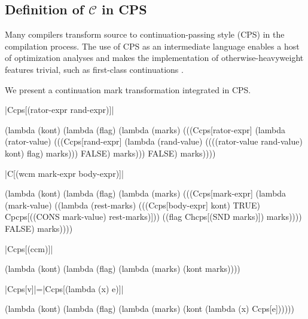 \documentclass{llncs}
\begin{document}
\subsection{Definition of $\mathcal{C}$ in CPS}

Many compilers transform source to continuation-passing style (CPS) in the compilation process. The use of CPS as an intermediate language enables a host of optimization analyses and makes the implementation of otherwise-heavyweight features trivial, such as first-class continuations \cite{appel2007compiling}.

We present a continuation mark transformation integrated in CPS.

\begin{schemedefn}{\scheme|Ccps[(rator-expr rand-expr)]|}
\begin{schemedisplay}
(lambda (kont)
   (lambda (flag)
     (lambda (marks)
       (((Ccps[rator-expr]
          (lambda (rator-value)
            (((Ccps[rand-expr]
               (lambda (rand-value)
                 ((((rator-value rand-value) kont) flag) marks)))
              FALSE)
             marks)))
         FALSE)
        marks))))
\end{schemedisplay}
\end{schemedefn}

\begin{schemedefn}{\scheme|C[(wcm mark-expr body-expr)]|}
\begin{schemedisplay}
(lambda (kont)
  (lambda (flag)
    (lambda (marks)
      (((Ccps[mark-expr]
          (lambda (mark-value) 
            ((lambda (rest-marks) 
               (((Ccps[body-expr] kont) TRUE) Cpcps[((CONS mark-value) rest-marks)]))
             ((flag Chcps[(SND marks)]) marks))))
        FALSE)
       marks))))
\end{schemedisplay}
\end{schemedefn}

\begin{schemedefn}{\scheme|Ccps[(ccm)]|}
\begin{schemedisplay}
(lambda (kont)
  (lambda (flag)
    (lambda (marks)
      (kont marks))))
\end{schemedisplay}
\end{schemedefn}

\begin{schemedefn}{\scheme|Ccps[v]|=\scheme|Ccps[(lambda (x) e)]|}
\begin{schemedisplay}
(lambda (kont)
  (lambda (flag)
    (lambda (marks)
      (kont (lambda (x) Ccps[e])))))
\end{schemedisplay}
\end{schemedefn}
\end{document}
